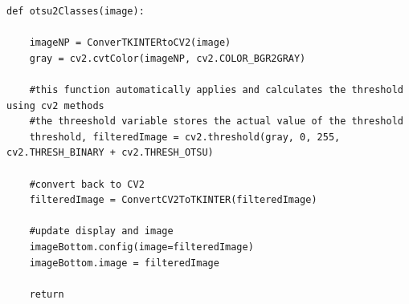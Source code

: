 \begin{verbatim}
def otsu2Classes(image):
    
    imageNP = ConverTKINTERtoCV2(image)
    gray = cv2.cvtColor(imageNP, cv2.COLOR_BGR2GRAY)

    #this function automatically applies and calculates the threshold using cv2 methods
    #the threeshold variable stores the actual value of the threshold
    threshold, filteredImage = cv2.threshold(gray, 0, 255, cv2.THRESH_BINARY + cv2.THRESH_OTSU)

    #convert back to CV2
    filteredImage = ConvertCV2ToTKINTER(filteredImage)

    #update display and image
    imageBottom.config(image=filteredImage)
    imageBottom.image = filteredImage

    return
\end{verbatim}
